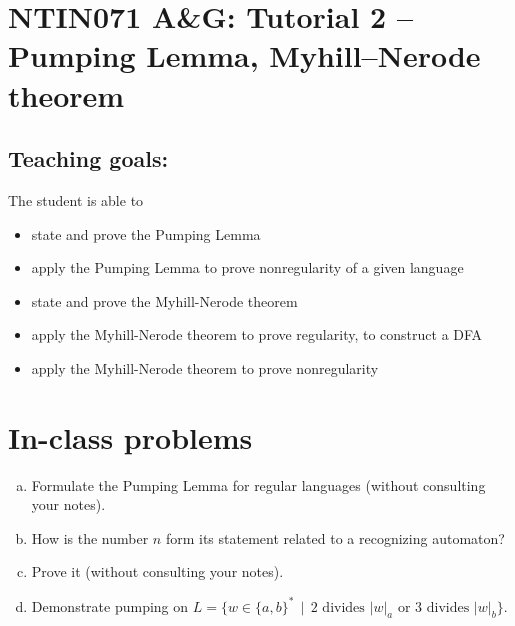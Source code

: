 \documentclass[a4paper,12pt]{amsart}
\begin{document}
\thispagestyle{empty}

\section*{NTIN071 A\&G: Tutorial 2 -- Pumping Lemma, Myhill--Nerode theorem}

\medskip

\subsection*{Teaching goals:} The student is able to

    \begin{itemize}\setlength{\itemsep}{0pt}
        \item state and prove the Pumping Lemma
        \item apply the Pumping Lemma to prove nonregularity of a given language
        \item state and prove the Myhill-Nerode theorem
        \item apply the Myhill-Nerode theorem to prove regularity, to construct a DFA
        \item apply the Myhill-Nerode theorem to prove nonregularity
    \end{itemize}

\section*{In-class problems}


\medskip\begin{problem}
    
    \begin{enumerate}[(a)]\setlength\itemsep{6pt}
        \item Formulate the Pumping Lemma for regular languages (without consulting your notes).
        \item How is the number $n$ form its statement related to a recognizing automaton?
        \item Prove it (without consulting your notes).
        \item Demonstrate pumping on $L=\{w\in\{a,b\}^* \,\mid\,\text{2 divides $|w|_a$ or 3 divides $|w|_b$}\}$.
    \end{enumerate}

\end{problem}
    
\end{document}
